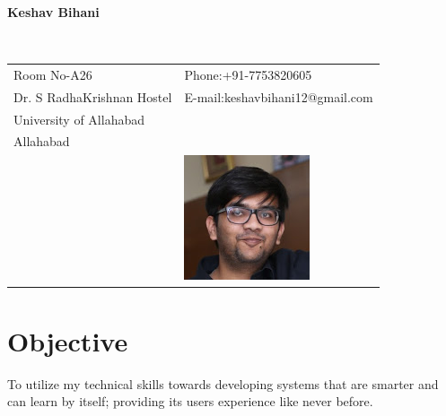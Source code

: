 \documentclass[12pt]{article}
\begin{document}
\vspace{0.5in}
\begin{center}\begin{large}\textbf{Keshav Bihani}\end{large}\end{center}\textbf{\hrulefill}\\

\begin{tabular}{@{}p{4in}p{3in}}
Room No-A26 & {Phone:}+91-7753820605 \\
Dr. S RadhaKrishnan Hostel & {E-mail:}keshavbihani12@gmail.com\\
University of Allahabad \\
Allahabad\\
& \includegraphics[scale=0.8]{keshav1.jpg}\\
\end{tabular}
\section*{Objective}
To utilize my technical skills towards developing systems that are smarter and can learn by itself; providing its users experience like never before.   
\end{document}
